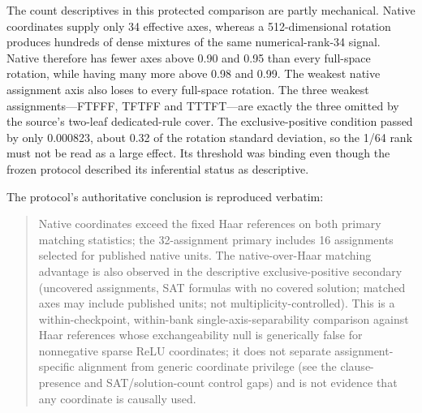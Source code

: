 \documentclass[
  british,
  11pt,
  a4paper,
]{article}
\begin{document}
The count descriptives in this protected comparison are partly
mechanical. Native coordinates supply only 34 effective axes, whereas a
512-dimensional rotation produces hundreds of dense mixtures of the same
numerical-rank-34 signal. Native therefore has fewer axes above 0.90 and
0.95 than every full-space rotation, while having many more above 0.98
and 0.99. The weakest native assignment axis also loses to every
full-space rotation. The three weakest assignments---FTFFF, TFTFF and
TTTFT---are exactly the three omitted by the source's two-leaf
dedicated-rule cover. The exclusive-positive condition passed by only
0.000823, about 0.32 of the rotation standard deviation, so the 1/64
rank must not be read as a large effect. Its threshold was binding even
though the frozen protocol described its inferential status as
descriptive.

The protocol's authoritative conclusion is reproduced verbatim:

\begin{quote}
Native coordinates exceed the fixed Haar references on both primary
matching statistics; the 32-assignment primary includes 16 assignments
selected for published native units. The native-over-Haar matching
advantage is also observed in the descriptive exclusive-positive
secondary (uncovered assignments, SAT formulas with no covered solution;
matched axes may include published units; not multiplicity-controlled).
This is a within-checkpoint, within-bank single-axis-separability
comparison against Haar references whose exchangeability null is
generically false for nonnegative sparse ReLU coordinates; it does not
separate assignment-specific alignment from generic coordinate privilege
(see the clause-presence and SAT/solution-count control gaps) and is not
evidence that any coordinate is causally used.
\end{quote}
\end{document}
